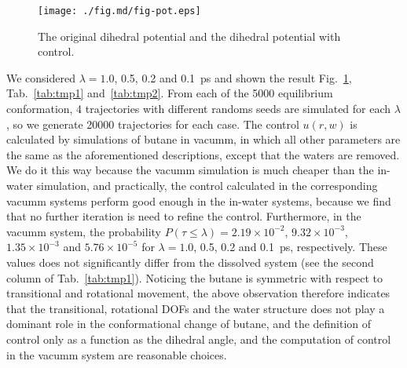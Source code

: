 \documentclass[final]{siamltex}
\begin{document}
\begin{figure}
  \centering
  \texttt{[image: ./fig.md/fig-pot.eps]}
  \caption{The original dihedral potential and the dihedral potential
    with control.}
  \label{fig:tmp2}
\end{figure}


We considered $\lambda = 1.0$, 0.5, 0.2 and 0.1~ps and shown the
result Fig.~\ref{fig:tmp2}, Tab.~\ref{tab:tmp1} and~\ref{tab:tmp2}.
From each of the 5000 equilibrium conformation, 4 trajectories with
different randoms seeds are simulated for each $\lambda$, so we
generate 20000 trajectories for each case.  The control $u(r, w)$ is
calculated by simulations of butane in vacumm, in which all other
parameters are the same as the aforementioned descriptions, except
that the waters are removed. We do it this way because the vacumm
simulation is much cheaper than the in-water simulation, and
practically, the control calculated in the corresponding vacumm
systems perform good enough in the in-water systems, because we find
that no further iteration is need to refine the control. Furthermore,
in the vacumm system, the probability $P(\tau\leq\lambda) =
2.19\times10^{-2}$, $9.32\times 10^{-3}$, $1.35\times 10^{-3}$ and
$5.76\times 10^{-5}$ for $\lambda = 1.0$, 0.5, 0.2 and 0.1~ps,
respectively. These values does not significantly differ from the
dissolved system (see the second column of Tab.~\ref{tab:tmp1}).
Noticing the butane is symmetric with respect to transitional and
rotational movement, the above observation therefore indicates that
the transitional, rotational DOFs and the water structure does not
play a dominant role in the conformational change of butane, and the
definition of control only as a function as the dihedral angle, and
the computation of control in the vacumm system are reasonable
choices.  
\end{document}
